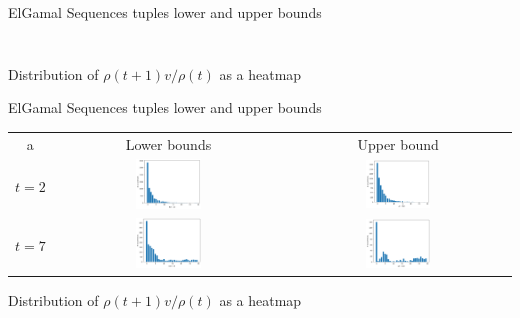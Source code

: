 \begin{frame}{ElGamal Sequences tuples lower and upper bounds}
\begin{columns}
\begin{column}{0.45\textwidth}
\begin{figure}
            \end{figure}
        \end{column}
    \end{columns}
    \begin{center}
                Distribution of $\rho(t+1)v/\rho(t)$ as a heatmap
    \end{center}
\end{frame}

\begin{frame}{ElGamal Sequences tuples lower and upper bounds}
    \begin{tabular}{ccc}
        a & Lower bounds & Upper bound \\
        $t = 2$ & 
        \includegraphics[width=0.3\textwidth]{figures/LB0t2with012outliers.png} &
        \includegraphics[width=0.3\textwidth]{figures/UBt2with005outliers.png} \\
        $t = 7$ & 
        \includegraphics[width=0.3\textwidth]{figures/LB0t7with5975outliers.png} &
        \includegraphics[width=0.3\textwidth]{figures/UBt7with9356outliers.png} 
    \end{tabular}
    \begin{center}
                Distribution of $\rho(t+1)v/\rho(t)$ as a heatmap
    \end{center}
\end{frame}


